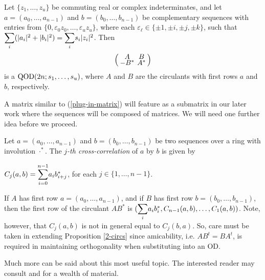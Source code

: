 \documentclass[../../../main]{subfiles}
\begin{document}
 \begin{prop}\label{2-circs}
  Let $\{z_1,\dots,z_u\}$ be commuting real or complex indeterminates, and let
  $a=(a_0,\dots,a_{n-1})$ and $b=(b_0,\dots,b_{n-1})$ be complementary sequences
  with entries from $\{0,\varepsilon_0z_0, \dots, \varepsilon_uz_u\}$, where
  each $\varepsilon_\ell \in \{\pm 1, \pm i, \pm j, \pm k\}$, such that
  $\ssum_i(|a_i|^2 + |b_i|^2)=\ssum_is_i\abs{z_i}^2$. Then 
  \begin{equation}\label{plug-in-matrix}
  \arraycolsep=2.0pt\def\arraystretch{0.5}
   \left(\begin{array}{cc}
    A&B\\-B^*&A^*
   \end{array}\right)
  \end{equation}
  is a $\text{QOD}(2n;s_1,\dots,s_u)$, where $A$ and $B$ are the circulants with first rows $a$ and $b$, respectively.
 \end{prop}

 A matrix similar to (\ref{plug-in-matrix}) will feature as a submatrix in our later work where the sequences will be composed of matrices. We will need one further idea before we proceed. 

 \begin{defin}
  Let $a=(a_0,\dots,a_{n-1})$ and $b=(b_0,\dots,b_{n-1})$ be two sequences over a ring with involution $\cdot^*$. The {\it $j$-th cross-correlation} of $a$ by $b$ is given by
  \begin{defenum}
   \item $C_j(a,b)=\ssum_{i=0}^{n-1}a_ib_{i+j}^*$, for each $j \in \{1,\dots,n-1\}$.
  \end{defenum}
 \end{defin}
 
 If $A$ has first row $a=(a_0,\dots,a_{n-1})$, and if $B$ has first row
 $b=(b_0,\dots,b_{n-1})$, then the first row of the circulant $AB^*$ is
 $(\ssum_ia_ib_i^*,C_{n-1}(a,b),\dots,C_1(a,b))$. Note, however, that $C_j(a,b)$
 is not in general equal to $C_j(b,a)$. So, care must be taken in extending
 Proposition \ref{2-circs} since amicability, i.e. $AB^t=BA^t$, is required in maintaining
 orthogonality when substituting into an OD. 
 
 Much more can be said about this most useful topic. The interested reader 
 may consult \cite{seberry-od-2017} and \cite{seberry-yamada-hmatrices-designs}
 for a wealth of material. 

  \biblio
\end{document}
